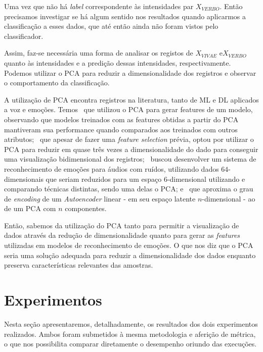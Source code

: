 Uma vez que não há \textit{label} correspondente às intensidades par $X_{VERBO}$. Então precisamos investigar se há algum sentido nos resultados quando aplicarmos a classificação a esses dados, que até então ainda não foram vistos pelo classificador.

Assim, faz-se necessária uma forma de analisar os registos de $X_{VIVAE}$ e$X_{VERBO}$ quanto às intensidades e a predição dessas intensidades, respectivamente. Podemos utilizar o \acrshort{PCA} para reduzir a dimensionalidade dos registros e observar o comportamento da classificação.

A utilização de \acrshort{PCA} encontra registros na literatura, tanto de \acrshort{ML} e \acrshort{DL} aplicados a voz e emoções. Temos~\cite{pca1} que utilizou o PCA para gerar features de um modelo, observando que modelos treinados com as features obtidas a partir do PCA mantiveram sua performance quando comparados aos treinados com outros atributos;~\cite{pca2} que apesar de fazer uma \textit{feature selection} prévia, optou por utilizar o \acrshort{PCA} para reduzir em quase três vezes a dimensionalidade do dado para conseguir uma visualização bidimensional dos registros;~\cite{pca3} buscou desenvolver um sistema de reconhecimento de emoções para áudios com ruídos, utilizando dados $64$-dimensionais que seriam reduzidos para um espaço $6$-dimensional utilizando e comparando técnicas distintas, sendo uma delas o \acrshort{PCA}; e~\cite{pca5} que aproxima o grau de \textit{encoding} de um \textit{Autoencoder} linear - em seu espaço latente $n$-dimensional - ao de um PCA com $n$ componentes.

Então, sabemos  da utilização do \acrshort{PCA} tanto para permitir a visualização de dados através da redução de dimensionalidade quanto para gerar as \textit{features} utilizadas em modelos de reconhecimento de emoções. O que nos diz que o \acrshort{PCA} seria uma solução adequada para reduzir a dimensionalidade dos dados enquanto preserva características relevantes das amostras.


\section{Experimentos}

Nesta seção apresentaremos, detalhadamente, os resultados dos dois experimentos realizados. Ambos foram submetidos à mesma metodologia e aferição de métrica, o que nos possibilita comparar diretamente o desempenho oriundo das execuções.\\


